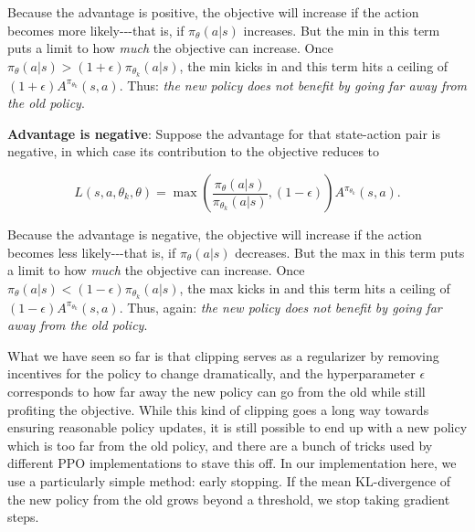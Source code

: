\documentclass[12pt,a4paper]{article}
\begin{document}
Because the advantage is positive, the objective will increase if the
action becomes more likely-\/-\/-that is, if \(\pi_{\theta}(a|s)\)
increases. But the min in this term puts a limit to how \emph{much} the
objective can increase. Once
\(\pi_{\theta}(a|s) > (1+\epsilon) \pi_{\theta_k}(a|s)\), the min kicks
in and this term hits a ceiling of
\((1+\epsilon) A^{\pi_{\theta_k}}(s,a)\). Thus: \emph{the new policy
does not benefit by going far away from the old policy}.

\textbf{Advantage is negative}: Suppose the advantage for that
state-action pair is negative, in which case its contribution to the
objective reduces to

\[L(s,a,\theta_k,\theta) = \max\left(
\frac{\pi_{\theta}(a|s)}{\pi_{\theta_k}(a|s)}, (1 - \epsilon)
\right)  A^{\pi_{\theta_k}}(s,a).\]

Because the advantage is negative, the objective will increase if the
action becomes less likely-\/-\/-that is, if \(\pi_{\theta}(a|s)\)
decreases. But the max in this term puts a limit to how \emph{much} the
objective can increase. Once
\(\pi_{\theta}(a|s) < (1-\epsilon) \pi_{\theta_k}(a|s)\), the max kicks
in and this term hits a ceiling of
\((1-\epsilon) A^{\pi_{\theta_k}}(s,a)\). Thus, again: \emph{the new
policy does not benefit by going far away from the old policy}.

What we have seen so far is that clipping serves as a regularizer by
removing incentives for the policy to change dramatically, and the
hyperparameter \(\epsilon\) corresponds to how far away the new policy
can go from the old while still profiting the objective. While this kind of clipping goes a long way towards ensuring reasonable
policy updates, it is still possible to end up with a new policy which
is too far from the old policy, and there are a bunch of tricks used by
different PPO implementations to stave this off. In our implementation
here, we use a particularly simple method: early stopping. If the mean
KL-divergence of the new policy from the old grows beyond a threshold,
we stop taking gradient steps.
\end{document}
